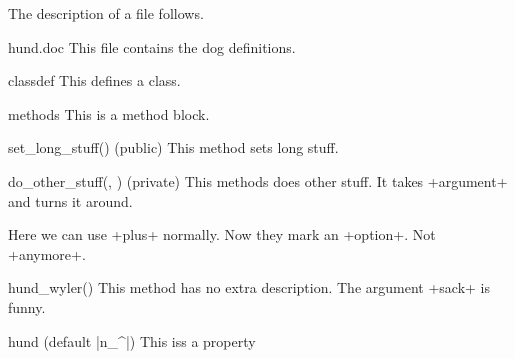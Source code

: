 \documentclass[a4paper]{article}
\begin{document}
The description of a file follows.
\begin{filedescription}{hund.doc}
    This file contains the dog definitions.
\end{filedescription}

\begin{matlabblock}{{classdef }}
  This defines a class.
\end{matlabblock}

\begin{matlabblock}{{methods}}
  This is a method block.
\end{matlabblock}

\begin{method}{set_long_stuff() (public)}
  This method sets long stuff.
\end{method}

\begin{method}{do_other_stuff(, ) (private)}
  This methods does other stuff. It takes +argument+ and turns it around.

  Here we can use +plus+ normally. \enableargshortcut Now they mark an +option+.
  \disableargshortcut  Not +anymore+.
\end{method}

\begin{method}{hund_wyler()}
  This method has no extra description. The argument +sack+ is funny.
\end{method}

\begin{property}{hund (default |n_^|)}
  This iss a property
\end{property}
\end{document}
